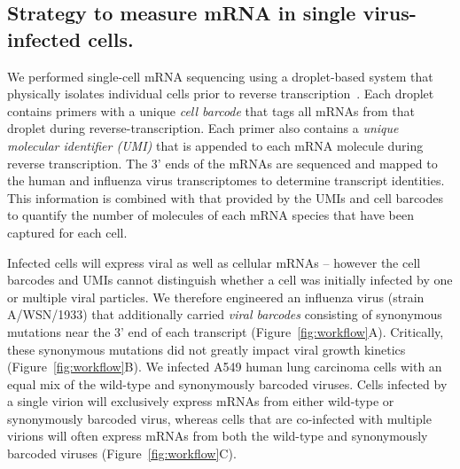 \documentclass[9pt,lineno]{elife}
\begin{document}
\subsection{Strategy to measure mRNA in single virus-infected cells.}
We performed single-cell mRNA sequencing using a droplet-based system that physically isolates individual cells prior to reverse transcription~\citep{zheng2017massively,macosko2015highly,Klein:2015ki}.
Each droplet contains primers with a unique \emph{cell barcode} that tags all mRNAs from that droplet during reverse-transcription.
Each primer also contains a \emph{unique molecular identifier (UMI)} that is appended to each mRNA molecule during reverse transcription.
The 3' ends of the mRNAs are sequenced and mapped to the human and influenza virus transcriptomes to determine transcript identities.
This information is combined with that provided by the UMIs and cell barcodes to quantify the number of molecules of each mRNA species that have been captured for each cell.

Infected cells will express viral as well as cellular mRNAs -- however the cell barcodes and UMIs cannot distinguish whether a cell was initially infected by one or multiple viral particles.
We therefore engineered an influenza virus (strain A/WSN/1933) that additionally carried \emph{viral barcodes} consisting of synonymous mutations near the 3' end of each transcript (Figure~\ref{fig:workflow}A).
Critically, these synonymous mutations did not greatly impact viral growth kinetics (Figure~\ref{fig:workflow}B).
We infected A549 human lung carcinoma cells with an equal mix of the wild-type and synonymously barcoded viruses.
Cells infected by a single virion will exclusively express mRNAs from either wild-type or synonymously barcoded virus, whereas cells that are co-infected with multiple virions will often express mRNAs from both the wild-type and synonymously barcoded viruses (Figure~\ref{fig:workflow}C).
\end{document}
